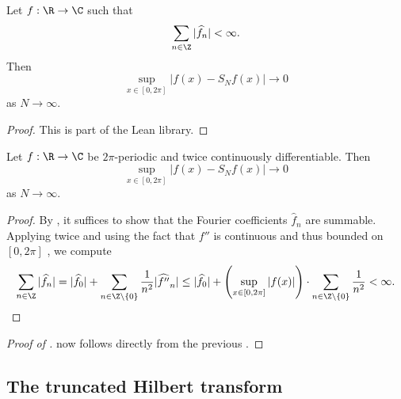 \begin{lemma}
\label{convergence-of-coeffs-summable}
\leanok
{}
Let $f:\R \to \C$ such that
\begin{equation}
    \sum_{n\in \Z} |\widehat{f}_n| < \infty.
\end{equation}
Then
\begin{equation}
    \sup_{x\in [0,2\pi]} |f(x) - S_Nf(x)| \rightarrow 0
\end{equation}
as $N \rightarrow \infty$.
\end{lemma}

\begin{proof}
\leanok
    This is part of the Lean library.
\end{proof}

\begin{lemma}
\label{convergence-for-twice-contdiff}
\leanok
{}
    Let $f:\R \to \C$ be $2\pi$-periodic and twice continuously differentiable. Then
    \begin{equation}
        \sup_{x\in [0,2\pi]} |f(x) - S_Nf(x)| \rightarrow 0
    \end{equation}
    as $N \rightarrow \infty$.
\end{lemma}
\begin{proof}
\leanok
By , it suffices to show that the Fourier coefficients $\widehat{f}_n$ are summable.
Applying  twice and using the fact that $f''$ is continuous and thus bounded on $[0,2\pi]$ , we compute
\begin{equation*}
    \sum_{n\in \Z} |\widehat{f}_n| = |\widehat{f}_0| + \sum_{n\in \Z \setminus \{0\}} \frac {1}{n^2} |\widehat{f''}_n|
    \le |\widehat{f}_0| + \left(\sup_{x\in [0,2\pi]} |f(x)| \right) \cdot \sum_{n\in \Z \setminus \{0\}} \frac {1}{n^2}
    < \infty.
\end{equation*}
\end{proof}

\begin{proof}[Proof of ]
\leanok
{}
     now follows directly from the previous .
\end{proof}


\subsection{The truncated Hilbert transform}
\label{10hilbert}





